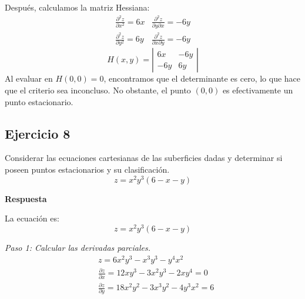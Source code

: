 \documentclass{report}
\begin{document}
Después, calculamos la matriz Hessiana:
$$
\begin{array}{ll}
\frac{\partial^2 z}{\partial x^2}=6 x & \frac{\partial^2 z}{\partial y \partial x}=-6 y \\
\frac{\partial^2 z}{\partial y^2}=6 y & \frac{\partial^2 z}{\partial x \partial y}=-6 y 
\end{array}
$$
$$
H(x, y)=\left|\begin{array}{cc}
6 x & -6 y \\
-6 y & 6 y
\end{array}\right|
$$
Al evaluar en $H(0,0)=0$, encontramos que el determinante es cero, lo que hace que el criterio sea inconcluso. No obstante, el punto $(0,0)$ es efectivamente un punto estacionario.\subsection{Ejercicio 8}
Considerar las ecuaciones cartesianas de las suberficies dadas y determinar si poseen puntos estacionarios y su clasificación.
\[ z = x^{2} y^{3}(6-x-y) \]

\textbf{Respuesta}

La ecuación es:
\[ z = x^{2} y^{3}(6-x-y) \]

\textit{Paso 1: Calcular las derivadas parciales.}
\[
\begin{aligned}
& z = 6x^{2}y^{3} - x^{3}y^{3} - y^{4}x^{2} \\
& \frac{\partial z}{\partial x} = 12xy^{3} - 3x^{2}y^{3} - 2xy^{4} = 0 \\
& \frac{\partial z}{\partial y} = 18x^{2}y^{2} - 3x^{3}y^{2} - 4y^{3}x^{2} = 6
\end{aligned}
\]
\end{document}
